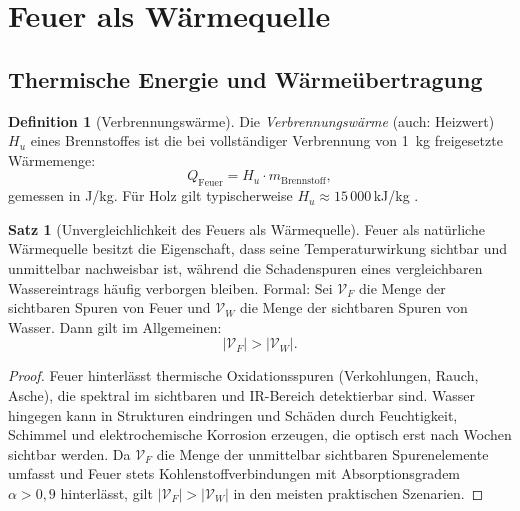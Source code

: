 ﻿\documentclass[a4paper,12pt]{article}
\theoremstyle{definition}
\newtheorem{definition}{Definition}
\newtheorem{satz}{Satz}
\begin{document}
\section{Feuer als W\"armequelle}
\label{sec:feuer}

\subsection{Thermische Energie und W\"arme\"ubertragung}

\begin{definition}[Verbrennungsw\"arme]
    Die \emph{Verbrennungsw\"arme} (auch: Heizwert) $H_u$ eines Brennstoffes ist
    die bei vollst\"andiger Verbrennung von 1~kg freigesetzte W\"armemenge:
    \[
        Q_{\mathrm{Feuer}} = H_u \cdot m_{\mathrm{Brennstoff}},
    \]
    gemessen in J/kg. F\"ur Holz gilt typischerweise $H_u \approx 15\,000$\,kJ/kg
    \cite{Baehr2016}.
\end{definition}

\begin{satz}[Unvergleichlichkeit des Feuers als W\"armequelle]
\label{satz:feuer}
    Feuer als nat\"urliche W\"armequelle besitzt die Eigenschaft, dass seine
    Temperaturwirkung sichtbar und unmittelbar nachweisbar ist, w\"ahrend die
    Schadenspuren eines vergleichbaren Wassereintrags h\"aufig verborgen bleiben.
    Formal: Sei $\mathcal{V}_F$ die Menge der sichtbaren Spuren von Feuer und
    $\mathcal{V}_W$ die Menge der sichtbaren Spuren von Wasser. Dann gilt im
    Allgemeinen:
    \[
        |\mathcal{V}_F| > |\mathcal{V}_W|.
    \]
\end{satz}

\begin{proof}
    Feuer hinterl\"asst thermische Oxidationsspuren (Verkohlungen, Rauch, Asche),
    die spektral im sichtbaren und IR-Bereich detektierbar sind. Wasser hingegen
    kann in Strukturen eindringen und Sch\"aden durch Feuchtigkeit, Schimmel und
    elektrochemische Korrosion erzeugen, die optisch erst nach Wochen sichtbar werden.
    Da $\mathcal{V}_F$ die Menge der unmittelbar sichtbaren Spurenelemente umfasst und
    Feuer stets Kohlenstoffverbindungen mit Absorptionsgradem $\alpha > 0{,}9$ hinterl\"asst,
    gilt $|\mathcal{V}_F| > |\mathcal{V}_W|$ in den meisten praktischen Szenarien. \qedhere
\end{proof}
\end{document}
